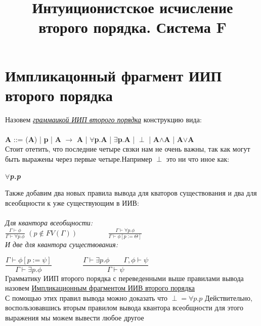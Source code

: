 \documentclass[10pt,a4paper]{article}
\title{Интуиционистское исчисление второго порядка. Система F}
\begin{document}
	\maketitle
	\section{Импликацонный фрагмент ИИП второго порядка}
	\large Назовем \textit{\underline{граммаикой ИИП второго порядка}} конструкцию вида: \\ \\
	\textbf{A} ::= 
	 (\textbf{A}) |
	 \textbf{p} |
	 \textbf{A} $\rightarrow$ \textbf{A} |
	 $\forall$\textbf{p}.\textbf{A} | 
	 $\exists$\textbf{p}.\textbf{A} |
	 $\perp$ |
	 \textbf{A}$\land$\textbf{A} |
	 \textbf{A}$\lor$\textbf{A} \\
	
	\large Стоит отетить, что последние четыре свзки нам не очень важны, так как могут быть выражены через первые четыре.Например $\perp$ это ни что иное как: 
	\begin{center}
			{\textbf{\textsl\textit{\large $\forall$p.p}}} \\
	\end{center}

   
   	\large Также добавим два новых правила вывода дл\textsl{}я кваторов существования и два для всеобщности к уже существующим в ИИВ: \\ \\
  	
  	\emph{Для квантора всеобщности:} \\ 
  	
  	\huge{$\frac{\Gamma\vdash\phi}{\Gamma\vdash\forall p.\phi}$} \Large$(p\notin FV(\Gamma)) \qquad\qquad$ 
   	\huge{$\frac{\Gamma\vdash\forall p.\phi}{\Gamma\vdash\phi[p:=\Theta]}$}	\\
   	
	\emph{\large И две для квантора существования: \\}
 	
 	\Large{$\dfrac{\Gamma\vdash\phi[p:= \psi]}{\Gamma\vdash\exists p.\phi}\qquad\qquad$} 
	\Large{$\dfrac{\Gamma\vdash\exists p.\phi\qquad\Gamma, \phi\vdash\psi}{\Gamma\vdash\psi}$}\\ 
   	
   	
   	\large Грамматику ИИП второго порядка с переведенными выше правилами вывода назовем \underline{Импликационным фрагментом ИИВ второго порядка}  \\ 
   	\large {С помощью этих правил вывода можно доказать что \textbf{${\perp = \forall p.p}$}
   	Действительно, воспользовавшись вторым правилом вывода квантора всеобщности для этого выражения мы можем вывести любое другое}
   
\end{document}

